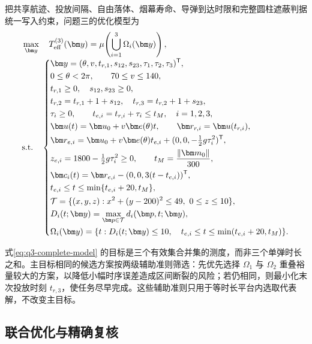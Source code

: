 把共享航迹、投放间隔、自由落体、烟幕寿命、导弹到达时限和完整圆柱遮蔽判据统一写入约束，问题三的优化模型为
\begin{equation}
\begin{aligned}
&\max_{\bm y}\quad T_{\mathrm{eff}}^{(3)}(\bm y)
=\mu\!\left(\bigcup_{i=1}^{3}\Omega_i(\bm y)\right),\\[-1mm]
&\text{\rm s.t.}\quad
\left\{
\begin{aligned}
&\bm y=(\theta,v,t_{r,1},s_{12},s_{23},\tau_1,\tau_2,\tau_3)^{\mathsf T},\\
&0\le\theta<2\pi,\qquad 70\le v\le140,\\
&t_{r,1}\ge0,\quad s_{12},s_{23}\ge0,\\
&t_{r,2}=t_{r,1}+1+s_{12},\quad
 t_{r,3}=t_{r,2}+1+s_{23},\\
&\tau_i\ge0,\qquad t_{e,i}=t_{r,i}+\tau_i\le t_M,\quad i=1,2,3,\\
&\bm u(t)=\bm u_0+v\bm e(\theta)t,\qquad
 \bm r_{r,i}=\bm u(t_{r,i}),\\
&\bm r_{e,i}=\bm u_0+v\bm e(\theta)t_{e,i}
 +(0,0,-\tfrac12g\tau_i^2)^{\mathsf T},\\
&z_{e,i}=1800-\tfrac12g\tau_i^2\ge0,\qquad
 t_M=\dfrac{\lVert\bm m_0\rVert}{300},\\
&\bm c_i(t)=\bm r_{e,i}-(0,0,3(t-t_{e,i}))^{\mathsf T},\\
&t_{e,i}\le t\le\min\{t_{e,i}+20,t_M\},\\
&\mathcal T=\{(x,y,z):x^2+(y-200)^2\le49,\ 0\le z\le10\},\\
&D_i(t;\bm y)=\displaystyle\max_{\bm p\in\mathcal T}d_i(\bm p,t;\bm y),\\
&\Omega_i(\bm y)=\{t:D_i(t;\bm y)\le10,\quad
 t_{e,i}\le t\le\min(t_{e,i}+20,t_M)\}.
\end{aligned}
\right.
\end{aligned}
\label{eq:q3-complete-model}
\end{equation}

式\cref{eq:q3-complete-model} 的目标是三个有效集合并集的测度，而非三个单弹时长之和。主目标相同的候选方案按两级辅助准则筛选：先优先选择 $\Omega_1$ 与 $\Omega_2$ 重叠裕量较大的方案，以降低小幅时序误差造成区间断裂的风险；若仍相同，则最小化末次投放时刻 $t_{r,3}$，使任务尽早完成。这些辅助准则只用于等时长平台内选取代表解，不改变主目标。

\subsection{联合优化与精确复核}

